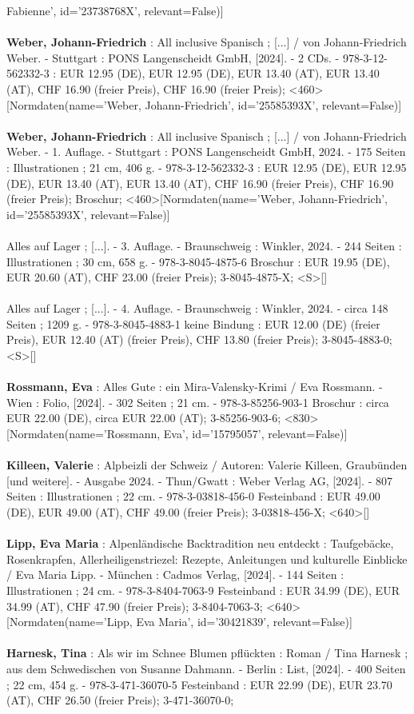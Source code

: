 \documentclass{article}
\begin{document}
\begin{multicols}{3}
Fabienne', id='23738768X', relevant=False)]\\\\\textbf{Weber, Johann-Friedrich} : All inclusive Spanisch ; [...] / von Johann-Friedrich Weber. - Stuttgart : PONS Langenscheidt GmbH, [2024]. - 2 CDs. - 978-3-12-562332-3 : EUR 12.95 (DE), EUR 12.95 (DE), EUR 13.40 (AT), EUR 13.40 (AT), CHF 16.90 (freier Preis), CHF 16.90 (freier Preis); <460>[Normdaten(name='Weber, Johann-Friedrich', id='25585393X', relevant=False)]\\\\\textbf{Weber, Johann-Friedrich} : All inclusive Spanisch ; [...] / von Johann-Friedrich Weber. - 1. Auflage. - Stuttgart : PONS Langenscheidt GmbH, 2024. - 175 Seiten : Illustrationen ; 21 cm, 406 g. - 978-3-12-562332-3 : EUR 12.95 (DE), EUR 12.95 (DE), EUR 13.40 (AT), EUR 13.40 (AT), CHF 16.90 (freier Preis), CHF 16.90 (freier Preis); Broschur; <460>[Normdaten(name='Weber, Johann-Friedrich', id='25585393X', relevant=False)]\\\\Alles auf Lager ; [...]. - 3. Auflage. - Braunschweig : Winkler, 2024. - 244 Seiten : Illustrationen ; 30 cm, 658 g. - 978-3-8045-4875-6 Broschur : EUR 19.95 (DE), EUR 20.60 (AT), CHF 23.00 (freier Preis); 3-8045-4875-X; <S>[]\\\\Alles auf Lager ; [...]. - 4. Auflage. - Braunschweig : Winkler, 2024. - circa 148 Seiten ; 1209 g. - 978-3-8045-4883-1 keine Bindung : EUR 12.00 (DE) (freier Preis), EUR 12.40 (AT) (freier Preis), CHF 13.80 (freier Preis); 3-8045-4883-0; <S>[]\\\\\textbf{Rossmann, Eva} : Alles Gute : ein Mira-Valensky-Krimi / Eva Rossmann. - Wien : Folio, [2024]. - 302 Seiten ; 21 cm. - 978-3-85256-903-1 Broschur : circa EUR 22.00 (DE), circa EUR 22.00 (AT); 3-85256-903-6; <830>[Normdaten(name='Rossmann, Eva', id='15795057', relevant=False)]\\\\\textbf{Killeen, Valerie} : Alpbeizli der Schweiz / Autoren: Valerie Killeen, Graubünden [und weitere]. - Ausgabe 2024. - Thun/Gwatt : Weber Verlag AG, [2024]. - 807 Seiten : Illustrationen ; 22 cm. - 978-3-03818-456-0 Festeinband : EUR 49.00 (DE), EUR 49.00 (AT), CHF 49.00 (freier Preis); 3-03818-456-X; <640>[]\\\\\textbf{Lipp, Eva Maria} : Alpenländische Backtradition neu entdeckt : Taufgebäcke, Rosenkrapfen, Allerheiligenstriezel: Rezepte, Anleitungen und kulturelle Einblicke / Eva Maria Lipp. - München : Cadmos Verlag, [2024]. - 144 Seiten : Illustrationen ; 24 cm. - 978-3-8404-7063-9 Festeinband : EUR 34.99 (DE), EUR 34.99 (AT), CHF 47.90 (freier Preis); 3-8404-7063-3; <640>[Normdaten(name='Lipp, Eva Maria', id='30421839', relevant=False)]\\\\\textbf{Harnesk, Tina} : Als wir im Schnee Blumen pflückten : Roman / Tina Harnesk ; aus dem Schwedischen von Susanne Dahmann. - Berlin : List, [2024]. - 400 Seiten ; 22 cm, 454 g. - 978-3-471-36070-5 Festeinband : EUR 22.99 (DE), EUR 23.70 (AT), CHF 26.50 (freier Preis); 3-471-36070-0; 
\end{multicols}
\end{document}
